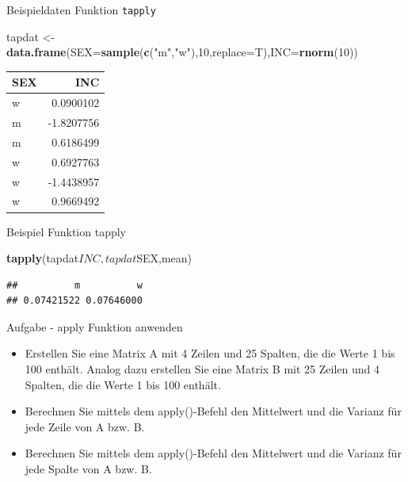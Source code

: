 \documentclass[ignorenonframetext,]{beamer}
\newenvironment{Shaded}{}{}
\newcommand{\KeywordTok}[1]{\textcolor[rgb]{0.00,0.44,0.13}{\textbf{{#1}}}}
\newcommand{\DataTypeTok}[1]{\textcolor[rgb]{0.56,0.13,0.00}{{#1}}}
\newcommand{\DecValTok}[1]{\textcolor[rgb]{0.25,0.63,0.44}{{#1}}}
\newcommand{\StringTok}[1]{\textcolor[rgb]{0.25,0.44,0.63}{{#1}}}
\newcommand{\NormalTok}[1]{{#1}}
\begin{document}
\begin{frame}[fragile]{Beispieldaten Funktion \texttt{tapply}}

\begin{Shaded}
\begin{Highlighting}[]
\NormalTok{tapdat <-}\StringTok{ }\KeywordTok{data.frame}\NormalTok{(}\DataTypeTok{SEX=}\KeywordTok{sample}\NormalTok{(}\KeywordTok{c}\NormalTok{(}\StringTok{"m"}\NormalTok{,}\StringTok{"w"}\NormalTok{),}\DecValTok{10}\NormalTok{,}\DataTypeTok{replace=}\NormalTok{T),}\DataTypeTok{INC=}\KeywordTok{rnorm}\NormalTok{(}\DecValTok{10}\NormalTok{))}
\end{Highlighting}
\end{Shaded}

\begin{longtable}[]{@{}lr@{}}
\toprule
SEX & INC\tabularnewline
\midrule
\endhead
w & 0.0900102\tabularnewline
m & -1.8207756\tabularnewline
m & 0.6186499\tabularnewline
w & 0.6927763\tabularnewline
w & -1.4438957\tabularnewline
w & 0.9669492\tabularnewline
\bottomrule
\end{longtable}

\end{frame}

\begin{frame}[fragile]{Beispiel Funktion tapply}

\begin{Shaded}
\begin{Highlighting}[]
\KeywordTok{tapply}\NormalTok{(tapdat$INC,tapdat$SEX,mean)}
\end{Highlighting}
\end{Shaded}

\begin{verbatim}
##          m          w 
## 0.07421522 0.07646000
\end{verbatim}

\end{frame}

\begin{frame}{Aufgabe - apply Funktion anwenden}

\begin{itemize}
\item
  Erstellen Sie eine Matrix A mit 4 Zeilen und 25 Spalten, die die Werte
  1 bis 100 enthält. Analog dazu erstellen Sie eine Matrix B mit 25
  Zeilen und 4 Spalten, die die Werte 1 bis 100 enthält.
\item
  Berechnen Sie mittels dem apply()-Befehl den Mittelwert und die
  Varianz für jede Zeile von A bzw. B.
\item
  Berechnen Sie mittels dem apply()-Befehl den Mittelwert und die
  Varianz für jede Spalte von A bzw. B.
\end{itemize}

\end{frame}
\end{document}
